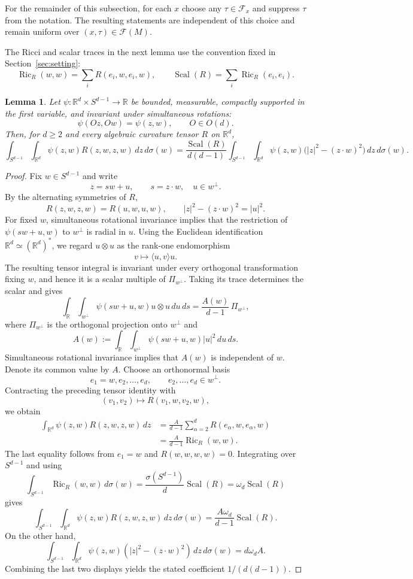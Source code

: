 \documentclass[11pt]{article}
\newtheorem{lemma}[theorem]{Lemma}
\theoremstyle{remark}
\newcommand{\R}{\mathbb R}
\newcommand{\Scal}{\operatorname{Scal}}
\newcommand{\Ric}{\operatorname{Ric}}
\numberwithin{equation}{section}
\begin{document}
For the remainder of this subsection, for each $x$ choose any
$\tau\in\mathcal F_x$ and suppress $\tau$ from the notation.  The resulting
statements are independent of this choice and remain uniform over
$(x,\tau)\in\mathcal F(M)$.

The Ricci and scalar traces in the next lemma use the convention fixed in
Section~\ref{sec:setting}:
\[
\Ric_R(w,w)=\sum_i R(e_i,w,e_i,w),\qquad
\Scal(R)=\sum_i\Ric_R(e_i,e_i).
\]

\begin{lemma}\label{lem:rotational-contraction}
Let $\psi:\R^d\times S^{d-1}\to\R$ be bounded, measurable, compactly supported
in the first variable, and invariant under simultaneous rotations:
\[
\psi(Oz,Ow)=\psi(z,w),\qquad O\in O(d).
\]
Then, for $d\ge2$ and every algebraic curvature tensor $R$ on $\R^d$,
\[
\int_{S^{d-1}}\int_{\R^d}\psi(z,w)R(z,w,z,w)\,dz\,d\sigma(w)
=\frac{\Scal(R)}{d(d-1)}
\int_{S^{d-1}}\int_{\R^d}\psi(z,w)
\bigl(|z|^2-(z\cdot w)^2\bigr)\,dz\,d\sigma(w).
\]
\end{lemma}

\begin{proof}
Fix $w\in S^{d-1}$ and write
\[
z=sw+u,\qquad s=z\cdot w,\quad u\in w^\perp.
\]
By the alternating symmetries of $R$,
\[
R(z,w,z,w)=R(u,w,u,w),
\qquad |z|^2-(z\cdot w)^2=|u|^2.
\]
For fixed $w$, simultaneous rotational invariance implies that the restriction
of $\psi(sw+u,w)$ to $w^\perp$ is radial in $u$.  
Using the Euclidean identification
$\mathbb R^d\simeq(\mathbb R^d)^*$, we regard $u\otimes u$ as the
rank-one endomorphism
\[
v\longmapsto \langle u,v\rangle u.
\]
The resulting tensor integral is invariant under every orthogonal
transformation fixing $w$, and hence it is a scalar multiple of
$\Pi_{w^\perp}$.  Taking its trace determines the scalar and gives
\[
\int_{\R}\int_{w^\perp}\psi(sw+u,w)u\otimes u\,du\,ds
=\frac{A(w)}{d-1}\,\Pi_{w^\perp},
\]
where $\Pi_{w^\perp}$ is the orthogonal projection onto $w^\perp$ and
\[
A(w):=\int_{\R}\int_{w^\perp}\psi(sw+u,w)|u|^2\,du\,ds.
\]
Simultaneous rotational invariance implies that $A(w)$ is independent of
$w$. Denote its common value by $A$.
Choose an orthonormal basis
\[
e_1=w,e_2,\ldots,e_d,
\qquad e_2,\ldots,e_d\in w^\perp.
\]
Contracting the preceding tensor identity with
\[
(v_1,v_2)\longmapsto R(v_1,w,v_2,w),
\]
we obtain
\[
\begin{aligned}
\int_{\R^d}\psi(z,w)R(z,w,z,w)\,dz
&=
\frac{A}{d-1}
\sum_{\alpha=2}^d R(e_\alpha,w,e_\alpha,w)\\
&=
\frac{A}{d-1}\Ric_R(w,w).
\end{aligned}
\]
The last equality follows from $e_1=w$ and
$R(w,w,w,w)=0$.
Integrating over $S^{d-1}$ and using
\[
\int_{S^{d-1}}\Ric_R(w,w)\,d\sigma(w)
=\frac{\sigma(S^{d-1})}{d}\Scal(R)
=\omega_d\Scal(R)
\]
gives
\[
\int_{S^{d-1}}\int_{\R^d}\psi(z,w)R(z,w,z,w)\,dz\,d\sigma(w)
=\frac{A\omega_d}{d-1}\Scal(R).
\]
On the other hand,
\[
\int_{S^{d-1}}\int_{\R^d}\psi(z,w)(|z|^2-(z\cdot w)^2)\,dz\,d\sigma(w)
=d\omega_d A.
\]
Combining the last two displays yields the stated coefficient
$1/(d(d-1))$.
\end{proof}
\end{document}

